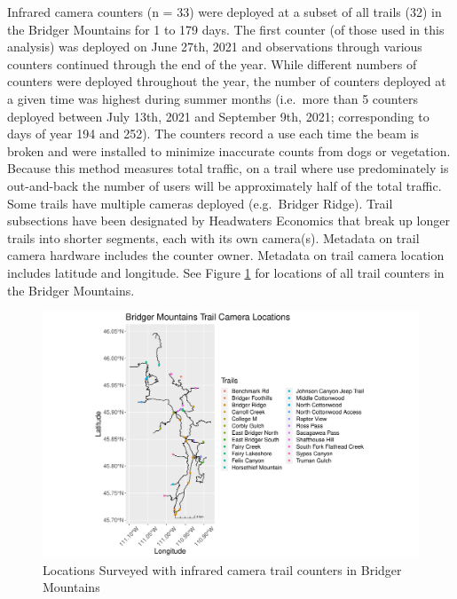 \documentclass[
]{book}
\begin{document}
Infrared camera counters (n = 33)
were deployed at a subset of all trails
(32)
in the Bridger Mountains for 1
to 179 days. The first counter
(of those used in this analysis) was deployed on June 27th, 2021 and
observations through various counters continued through the end of the
year. While different numbers of counters were deployed throughout the
year, the number of counters deployed at a given time was highest during
summer months (i.e.~more than 5 counters deployed between July 13th,
2021 and September 9th, 2021; corresponding to days of year 194 and
252). The counters record a use each time the beam is broken and were
installed to minimize inaccurate counts from dogs or vegetation. Because
this method measures total traffic, on a trail where use predominately
is out-and-back the number of users will be approximately half of the
total traffic. Some trails have multiple cameras deployed (e.g.~Bridger
Ridge). Trail subsections have been designated by Headwaters Economics
that break up longer trails into shorter segments, each with its own
camera(s). Metadata on trail camera hardware includes the counter owner.
Metadata on trail camera location includes latitude and longitude. See
Figure \ref{fig:counter-locations} for locations of all trail counters
in the Bridger Mountains.

\begin{figure}

{\centering \includegraphics[width=1\linewidth]{../figures/camera_locations} 

}

\caption{Locations Surveyed with infrared camera trail counters in Bridger Mountains}\label{fig:counter-locations}
\end{figure}
\end{document}
